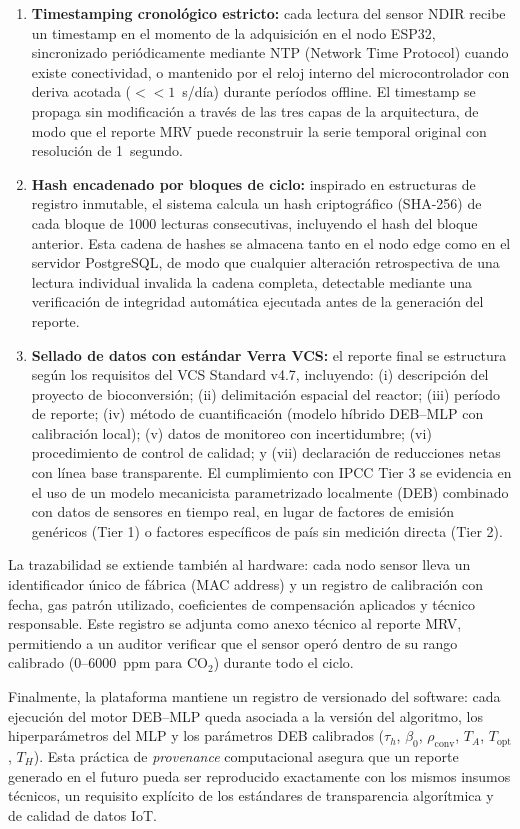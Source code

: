 \begin{enumerate}
    \item \textbf{Timestamping cronológico estricto:} cada lectura del sensor NDIR recibe un timestamp en el momento de la adquisición en el nodo ESP32, sincronizado periódicamente mediante NTP (Network Time Protocol) cuando existe conectividad, o mantenido por el reloj interno del microcontrolador con deriva acotada ($<< 1$~s/día) durante períodos offline. El timestamp se propaga sin modificación a través de las tres capas de la arquitectura, de modo que el reporte MRV puede reconstruir la serie temporal original con resolución de 1~segundo.
    
    \item \textbf{Hash encadenado por bloques de ciclo:} inspirado en estructuras de registro inmutable, el sistema calcula un hash criptográfico (SHA-256) de cada bloque de 1000 lecturas consecutivas, incluyendo el hash del bloque anterior. Esta cadena de hashes se almacena tanto en el nodo edge como en el servidor PostgreSQL, de modo que cualquier alteración retrospectiva de una lectura individual invalida la cadena completa, detectable mediante una verificación de integridad automática ejecutada antes de la generación del reporte.
    
    \item \textbf{Sellado de datos con estándar Verra VCS:} el reporte final se estructura según los requisitos del VCS Standard v4.7, incluyendo: (i) descripción del proyecto de bioconversión; (ii) delimitación espacial del reactor; (iii) período de reporte; (iv) método de cuantificación (modelo híbrido DEB--MLP con calibración local); (v) datos de monitoreo con incertidumbre; (vi) procedimiento de control de calidad; y (vii) declaración de reducciones netas con línea base transparente. El cumplimiento con IPCC Tier 3 se evidencia en el uso de un modelo mecanicista parametrizado localmente (DEB) combinado con datos de sensores en tiempo real, en lugar de factores de emisión genéricos (Tier 1) o factores específicos de país sin medición directa (Tier 2).
\end{enumerate}

La trazabilidad se extiende también al hardware: cada nodo sensor lleva un identificador único de fábrica (MAC address) y un registro de calibración con fecha, gas patrón utilizado, coeficientes de compensación aplicados y técnico responsable. Este registro se adjunta como anexo técnico al reporte MRV, permitiendo a un auditor verificar que el sensor operó dentro de su rango calibrado (0--6000~ppm para CO$_2$) durante todo el ciclo.

Finalmente, la plataforma mantiene un registro de versionado del software: cada ejecución del motor DEB--MLP queda asociada a la versión del algoritmo, los hiperparámetros del MLP y los parámetros DEB calibrados ($\tau_h$, $\beta_0$, $\rho_{\mathrm{conv}}$, $T_A$, $T_{\mathrm{opt}}$, $T_H$). Esta práctica de \emph{provenance} computacional asegura que un reporte generado en el futuro pueda ser reproducido exactamente con los mismos insumos técnicos, un requisito explícito de los estándares de transparencia algorítmica y de calidad de datos IoT.
